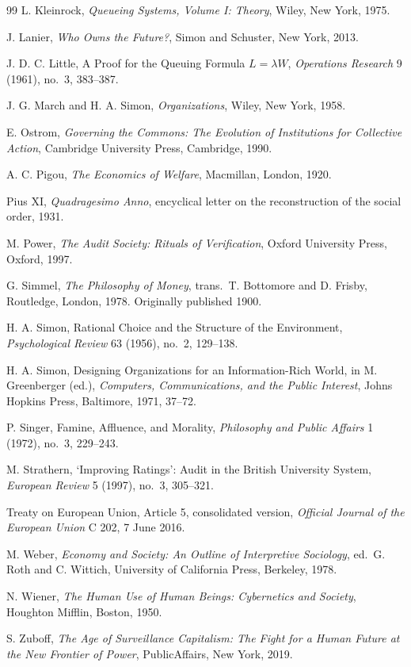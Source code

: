 \documentclass[11pt]{report}
\theoremstyle{definition}
\theoremstyle{remark}
\begin{document}
\begin{thebibliography}{99}
 L. Kleinrock, \textit{Queueing Systems, Volume I: Theory}, Wiley, New York, 1975.

 J. Lanier, \textit{Who Owns the Future?}, Simon and Schuster, New York, 2013.

 J. D. C. Little, A Proof for the Queuing Formula $L=\lambda W$, \textit{Operations Research} 9 (1961), no.\ 3, 383--387.

 J. G. March and H. A. Simon, \textit{Organizations}, Wiley, New York, 1958.

 E. Ostrom, \textit{Governing the Commons: The Evolution of Institutions for Collective Action}, Cambridge University Press, Cambridge, 1990.

 A. C. Pigou, \textit{The Economics of Welfare}, Macmillan, London, 1920.

 Pius XI, \textit{Quadragesimo Anno}, encyclical letter on the reconstruction of the social order, 1931.

 M. Power, \textit{The Audit Society: Rituals of Verification}, Oxford University Press, Oxford, 1997.

 G. Simmel, \textit{The Philosophy of Money}, trans.\ T. Bottomore and D. Frisby, Routledge, London, 1978. Originally published 1900.

 H. A. Simon, Rational Choice and the Structure of the Environment, \textit{Psychological Review} 63 (1956), no.\ 2, 129--138.

 H. A. Simon, Designing Organizations for an Information-Rich World, in M. Greenberger (ed.), \textit{Computers, Communications, and the Public Interest}, Johns Hopkins Press, Baltimore, 1971, 37--72.

 P. Singer, Famine, Affluence, and Morality, \textit{Philosophy and Public Affairs} 1 (1972), no.\ 3, 229--243.

 M. Strathern, `Improving Ratings': Audit in the British University System, \textit{European Review} 5 (1997), no.\ 3, 305--321.

 Treaty on European Union, Article 5, consolidated version, \textit{Official Journal of the European Union} C 202, 7 June 2016.

 M. Weber, \textit{Economy and Society: An Outline of Interpretive Sociology}, ed.\ G. Roth and C. Wittich, University of California Press, Berkeley, 1978.

 N. Wiener, \textit{The Human Use of Human Beings: Cybernetics and Society}, Houghton Mifflin, Boston, 1950.

 S. Zuboff, \textit{The Age of Surveillance Capitalism: The Fight for a Human Future at the New Frontier of Power}, PublicAffairs, New York, 2019.

\end{thebibliography}
\end{document}

